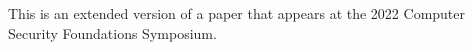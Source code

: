 \documentclass[sigconf, anonymous]{acmart}
\newcommand{\ignore}[1]{{}}
\begin{document}
\iftr
\bigskip
\begin{small}
 This is an extended version of a paper that
  appears at the 2022 Computer Security Foundations Symposium.
\end{small}
\fi
  







%

%


% 





\end{document}
